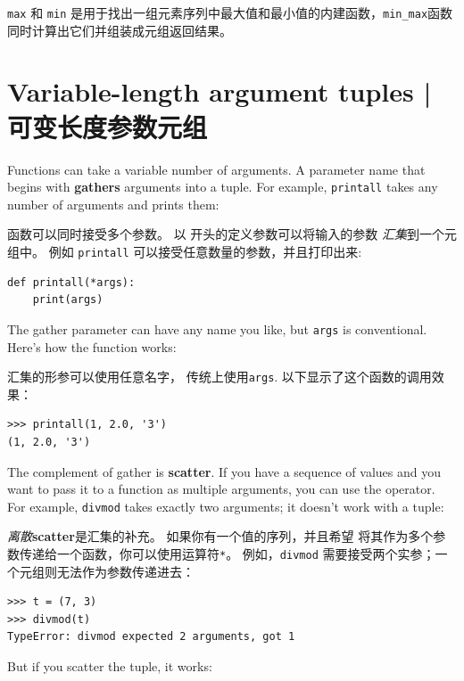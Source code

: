 \lstinline{max} 和 \lstinline{min} 是用于找出一组元素序列中最大值和最小值的内建函数，\lstinline{min_max}函数同时计算出它们并组装成元组返回结果。
 
 


\section{Variable-length argument tuples | 可变长度参数元组}
\label{gather}
 
  

Functions can take a variable number of arguments.  A parameter
name that begins with {\tt *} {\bf gathers} arguments into
a tuple.  For example, {\tt printall}
takes any number of arguments and prints them:

函数可以同时接受多个参数。 以 {\bf *} 开头的定义参数可以将输入的参数 \emph{汇集}到一个元组中。 例如 \lstinline{printall} 可以接受任意数量的参数，并且打印出来:

\begin{lstlisting}
def printall(*args):
    print(args)
\end{lstlisting}
%
The gather parameter can have any name you like, but {\tt args} is
conventional.  Here's how the function works:

汇集的形参可以使用任意名字， 传统上使用\lstinline{args}. 以下显示了这个函数的调用效果：

\begin{lstlisting}
>>> printall(1, 2.0, '3')
(1, 2.0, '3')
\end{lstlisting}
%
The complement of gather is {\bf scatter}.  If you have a
sequence of values and you want to pass it to a function
as multiple arguments, you can use the {\tt *} operator.
For example, {\tt divmod} takes exactly two arguments; it
doesn't work with a tuple:

\emph{离散}{\bf scatter}是汇集的补充。 如果你有一个值的序列，并且希望
将其作为多个参数传递给一个函数，你可以使用运算符\lstinline{*}。
例如，\lstinline{divmod} 需要接受两个实参；一个元组则无法作为参数传递进去：

  

\begin{lstlisting}
>>> t = (7, 3)
>>> divmod(t)
TypeError: divmod expected 2 arguments, got 1
\end{lstlisting}
%
But if you scatter the tuple, it works:

